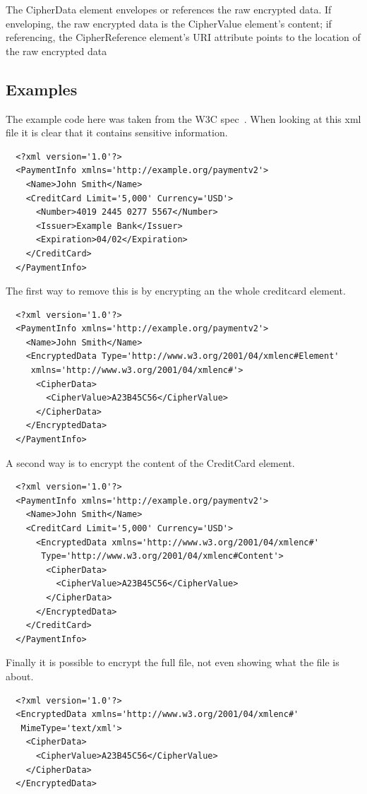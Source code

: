The CipherData element envelopes or references the raw encrypted data. If
enveloping, the raw encrypted data is the CipherValue element's content; if
referencing, the CipherReference element's URI attribute points to the location
of the raw encrypted data

\subsection{Examples}
The example code here was taken from the W3C spec~\autocite{w3c_xml_encryption}.
When looking at this xml file it is clear that it contains sensitive
information.

\begin{verbatim}
  <?xml version='1.0'?>
  <PaymentInfo xmlns='http://example.org/paymentv2'>
    <Name>John Smith</Name>
    <CreditCard Limit='5,000' Currency='USD'>
      <Number>4019 2445 0277 5567</Number>
      <Issuer>Example Bank</Issuer>
      <Expiration>04/02</Expiration>
    </CreditCard>
  </PaymentInfo>
\end{verbatim}

The first way to remove this is by encrypting an the whole creditcard element.

\begin{verbatim}
  <?xml version='1.0'?>
  <PaymentInfo xmlns='http://example.org/paymentv2'>
    <Name>John Smith</Name>
    <EncryptedData Type='http://www.w3.org/2001/04/xmlenc#Element'
     xmlns='http://www.w3.org/2001/04/xmlenc#'>
      <CipherData>
        <CipherValue>A23B45C56</CipherValue>
      </CipherData>
    </EncryptedData>
  </PaymentInfo>
\end{verbatim}

A second way is to encrypt the content of the CreditCard element.

\begin{verbatim}
  <?xml version='1.0'?>
  <PaymentInfo xmlns='http://example.org/paymentv2'>
    <Name>John Smith</Name>
    <CreditCard Limit='5,000' Currency='USD'>
      <EncryptedData xmlns='http://www.w3.org/2001/04/xmlenc#'
       Type='http://www.w3.org/2001/04/xmlenc#Content'>
        <CipherData>
          <CipherValue>A23B45C56</CipherValue>
        </CipherData>
      </EncryptedData>
    </CreditCard>
  </PaymentInfo>
\end{verbatim}

Finally it is possible to encrypt the full file, not even showing what the file
is about.

\begin{verbatim}
  <?xml version='1.0'?>
  <EncryptedData xmlns='http://www.w3.org/2001/04/xmlenc#'
   MimeType='text/xml'>
    <CipherData>
      <CipherValue>A23B45C56</CipherValue>
    </CipherData>
  </EncryptedData>
\end{verbatim}


